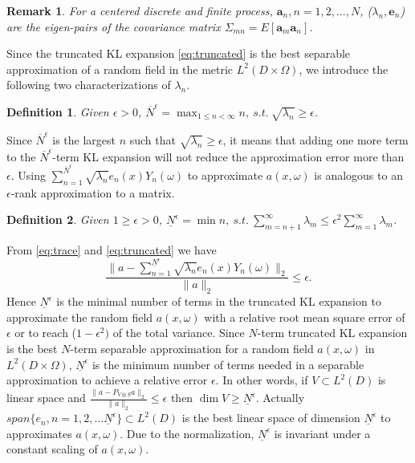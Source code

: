 \documentclass[11pt]{amsart}
\newtheorem{remark}{Remark}[section]
\newtheorem{definition}{Definition}[section]
\newcommand{\ba}{\mathbf{a}}
\newcommand{\be}{\mathbf{e}}
\newcommand{\w}{\omega}
\newcommand{\W}{\Omega}
\begin{document}
\begin{remark}
For a centered discrete and finite process, $\ba_n, n=1, 2, \ldots, N$, ($\lambda_n, \be_n$) are the eigen-pairs of the covariance matrix $\Sigma_{mn}=E[\ba_m\ba_n]$.
\end{remark}

Since the truncated KL expansion \eqref{eq:truncated} is the best separable approximation of a random field in the metric $L^2(D\times \W)$, we introduce the following two characterizations of $\lambda_n$. 

\begin{definition}
\label{def:def1}
Given $\epsilon >0$, $\overline{N}^{\epsilon} =\max_{1\le n < \infty} n, ~s.t.~ \sqrt{\lambda_n}\ge \epsilon$.
\end{definition}
Since $ \overline{N}^{\epsilon}$ is the largest $n$ such that $\sqrt{\lambda_n}\ge \epsilon$, it means that adding one more term to the $\overline{N}^{\epsilon}$-term KL expansion will not reduce the approximation error more than $\epsilon$.  Using $\sum_{n=1}^{\overline{N}^{\epsilon}}\sqrt{\lambda_n}e_n(x)Y_n(\w)$ to approximate $a(x,\omega)$ is analogous to an $\epsilon$-rank approximation to a matrix. 

\begin{definition}
\label{def:def2}
 Given $1\ge \epsilon >0$, $\underline{N}^{\epsilon}=\min n, ~s.t.~  \sum_{m=n+1}^{\infty}\lambda_m\le \epsilon^2 \sum_{m=1}^{\infty}\lambda_m$. 
\end{definition}
From \eqref{eq:trace} and \eqref{eq:truncated} we have 
\begin{equation}
\label{eq:quotient}
\frac{\|a-\sum_{n=1}^{\underline{N}^{\epsilon}}\sqrt{\lambda_n}e_n(x)Y_n(\w)\|_2}{\|a\|_2}\le \epsilon.
\end{equation}
Hence $\underline{N}^{\epsilon}$ is the minimal number of terms in the truncated KL expansion to approximate the random field $a(x,\w)$ with a relative root mean square error of $\epsilon$ or to reach ($1-\epsilon^2)$ of the total variance. 
Since $N$-term truncated KL expansion is the best $N$-term separable approximation for a random field $a(x,\w)$ in $L^2(D\times\Omega)$, 
$\underline{N}^{\epsilon}$ is the minimum number of terms needed in a separable approximation to achieve a relative error $\epsilon$. In other words, if $V\subset L^2(D)$ is linear space and $\frac{\|a-P_{V\otimes S}a\|_2}{\|a\|_2}\le \epsilon$ then $\dim V\ge \underline{N}^{\epsilon}$. Actually $span\{e_n, n=1, 2, \ldots \underline{N}^{\epsilon}\}\subset L^2(D)$ is the best linear space of dimension $\underline{N}^{\epsilon}$ to approximates $a(x,\w)$.  Due to the normalization, $\underline{N}^{\epsilon}$ is invariant under a constant scaling of $a(x,\w)$.
\end{document}
